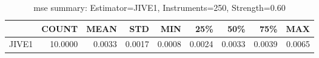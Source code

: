 \begin{table}[ht]
\centering
\caption{mse summary: Estimator=JIVE1, Instruments=250, Strength=0.60}
\begin{tabular}{lrrrrrrrr}
\toprule
 & COUNT & MEAN & STD & MIN & 25\% & 50\% & 75\% & MAX \\
\midrule
JIVE1 & 10.0000 & 0.0033 & 0.0017 & 0.0008 & 0.0024 & 0.0033 & 0.0039 & 0.0065 \\
\bottomrule
\end{tabular}
\end{table}
